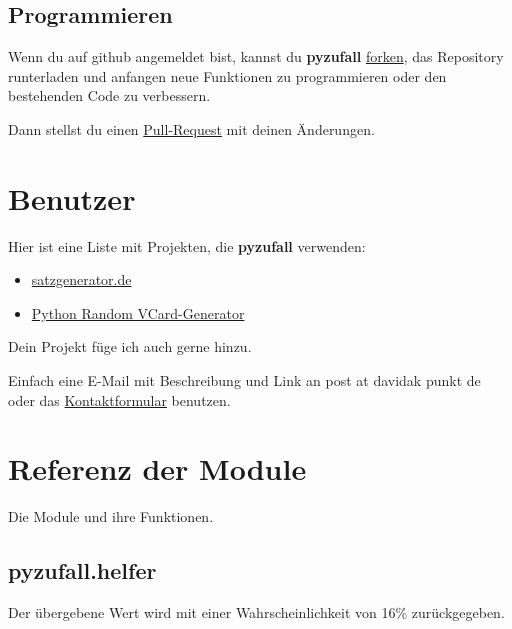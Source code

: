 \documentclass[a4paper,12pt,oneside]{sphinxmanual}
\begin{document}
\section{Programmieren}
\label{beitragen:programmieren}
Wenn du auf github angemeldet bist, kannst du \textbf{pyzufall} \href{https://help.github.com/articles/fork-a-repo}{forken}, das Repository runterladen und anfangen neue Funktionen zu programmieren oder den bestehenden Code zu verbessern.

Dann stellst du einen \href{https://help.github.com/articles/creating-a-pull-request}{Pull-Request} mit deinen Änderungen.


\chapter{Benutzer}
\label{benutzer::doc}\label{benutzer:benutzer}
Hier ist eine Liste mit Projekten, die \textbf{pyzufall} verwenden:
\begin{itemize}
\item {} 
\href{http://satzgenerator.de/}{satzgenerator.de}

\item {} 
\href{https://github.com/davidak/python-random-vcard-generator}{Python Random VCard-Generator}

\end{itemize}

Dein Projekt füge ich auch gerne hinzu.

Einfach eine E-Mail mit Beschreibung und Link an post at davidak punkt de oder das \href{http://davidak.de/kontakt}{Kontaktformular} benutzen.


\chapter{Referenz der Module}
\label{module:referenz-der-module}\label{module::doc}
Die Module und ihre Funktionen.


\section{pyzufall.helfer}
\label{module:pyzufall-helfer}\label{module:module-pyzufall.helfer}

\begin{fulllineitems}
\label{module:pyzufall.helfer.e16}
Der übergebene Wert wird mit einer Wahrscheinlichkeit von 16\% zurückgegeben.

\end{fulllineitems}
\end{document}
